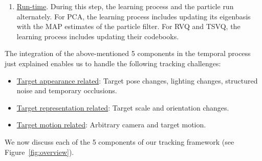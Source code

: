 \begin{Body}
\begin{enumerate}
\item \underline{Run-time}.  During this step, the learning process and the particle run alternately.  For PCA, the learning process includes updating its eigenbasis with the MAP estimates of the particle filter.  For RVQ and TSVQ, the learning process includes updating their codebooks. 
\end{enumerate}



The integration of the above-mentioned 5 components in the temporal process just explained enables us to handle the following tracking challenges:

\begin{itemize}
\item \underline{Target appearance related}: Target pose changes, lighting changes, structured noise and temporary occlusions.
\item  \underline{Target representation related}: Target scale and orientation changes.
\item  \underline{Target motion related}: Arbitrary camera and target motion.
\end{itemize}

We now discuss each of the 5 components of our tracking framework (see Figure~\ref{fig:overview}).  


\end{Body}
